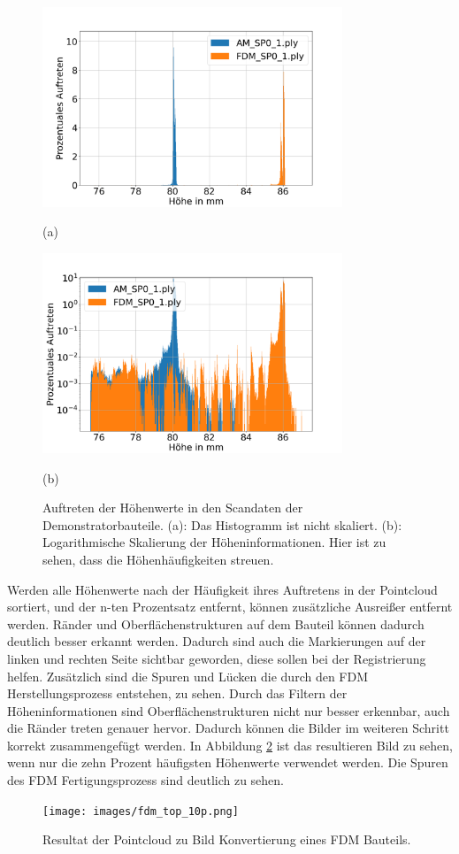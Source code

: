 \begin{figure}[H]
    \centering
    \begin{minipage}{\textwidth}
        \centering
        \includegraphics[width=0.8\textwidth]{images/height_occurange.png} %
        \caption*{(a)}
    \end{minipage}\hfill
    \begin{minipage}{\textwidth}
        \centering
        \includegraphics[width=0.8\textwidth]{images/height_occurange_log.png} %
        \caption*{(b)}
    \end{minipage}
    \caption{Auftreten der Höhenwerte in den Scandaten der Demonstratorbauteile. 
    (a): Das Histogramm ist nicht skaliert. (b): Logarithmische Skalierung der 
    Höheninformationen. Hier ist zu sehen, dass die Höhenhäufigkeiten streuen.}
    \label{fig:brightness}
\end{figure}

Werden alle Höhenwerte nach der Häufigkeit ihres 
Auftretens in der Pointcloud sortiert, und der n-ten Prozentsatz entfernt, können
zusätzliche Ausreißer entfernt werden.
Ränder und Oberflächenstrukturen auf dem Bauteil können dadurch deutlich besser erkannt werden. 
Dadurch sind auch die Markierungen auf der linken und rechten Seite sichtbar geworden,
diese sollen bei der Registrierung
helfen. Zusätzlich sind die Spuren und Lücken die durch den FDM 
Herstellungsprozess entstehen, zu sehen.
Durch das Filtern der Höheninformationen sind Oberflächenstrukturen nicht nur besser
erkennbar, auch die Ränder treten genauer hervor. 
Dadurch können die Bilder im weiteren Schritt korrekt zusammengefügt werden.
In Abbildung \ref{fig:10p} ist das resultieren Bild zu sehen, wenn nur die zehn Prozent
häufigsten Höhenwerte verwendet werden.
Die Spuren des FDM Fertigungsprozess sind deutlich zu sehen.

\begin{figure}[H]
    \centering
    \texttt{[image: images/fdm\_top\_10p.png]}
    \caption{Resultat der Pointcloud zu Bild Konvertierung eines FDM Bauteils.}
    \label{fig:10p}
\end{figure}
